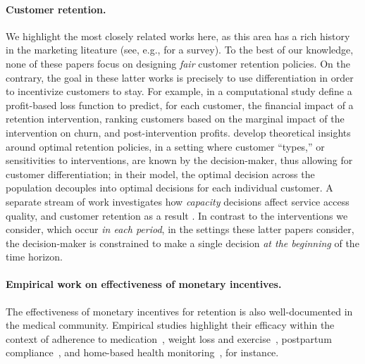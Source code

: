 \documentclass[12pt]{article}
\begin{document}
\paragraph{Customer retention.} We highlight the most closely related works here, as this area has a rich history in the marketing liteature (see, e.g., \cite{ascarza2018pursuit} for a survey). To the best of our knowledge, none of these papers focus on designing {\it fair} customer retention policies. On the contrary, the goal in these latter works is precisely to use differentiation in order to incentivize customers to stay. For example, in a computational study \cite{lemmens2020managing} define a profit-based loss function to predict, for each customer, the financial impact of a retention intervention, ranking customers based on the marginal impact of the intervention on churn, and post-intervention profits. \cite{aflaki2014managing} develop theoretical insights around optimal retention policies, in a setting where customer ``types,'' or sensitivities to interventions, are known by the decision-maker, thus allowing for customer differentiation; in their model, the optimal decision across the population decouples into optimal decisions for each individual customer. 
A separate stream of work investigates how {\it capacity} decisions affect service access quality, and customer retention as a result \cite{afeche2017customer,furman2021customer}. In contrast to the interventions we consider, which occur {\it in each period}, in the settings these latter papers consider, the decision-maker is constrained to make a single decision {\it at the beginning} of the time horizon.

\paragraph{Empirical work on effectiveness of monetary incentives.} The effectiveness of monetary incentives for retention is also well-documented in the medical community. Empirical studies highlight their efficacy within the context of adherence to medication~\cite{volpp2008test,kimmel2012randomized}, weight loss and exercise~\cite{volpp2008financial,meeker2021combining}, postpartum compliance~\cite{stevens1994incentives}, and home-based health monitoring~\cite{sen2014financial}, for instance.
\end{document}
